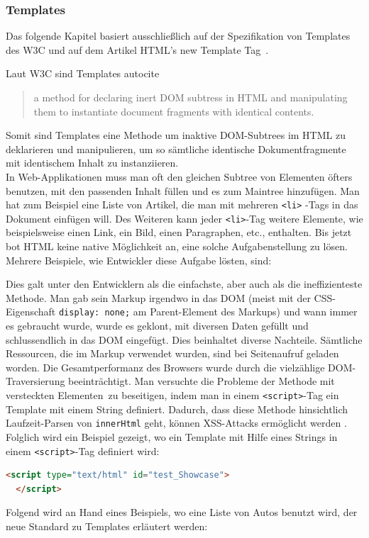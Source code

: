 \subsubsection{Templates}
\label{sec:3_WC_Templates}

Das folgende Kapitel basiert ausschließlich auf der Spezifikation von Templates des W3C \citereset \autocite{Weinstein.2013} und auf dem Artikel \glqq HTML's new Template Tag\grqq\ \citereset \autocite{BidelmanTemplate.2013}.

Laut W3C sind Templates autocite
\begin{quote}
\glqq
  a method for declaring inert DOM subtress in HTML and manipulating them to instantiate document fragments with identical contents.
\grqq
\end{quote}
Somit sind Templates eine Methode um inaktive DOM-Subtrees im HTML zu deklarieren und manipulieren, um so sämtliche identische Dokumentfragmente mit identischem Inhalt zu instanziieren.\\
In Web-Applikationen muss man oft den gleichen Subtree von Elementen öfters benutzen, mit den passenden Inhalt füllen und es zum Maintree hinzufügen. Man hat zum Beispiel eine Liste von Artikel, die man mit mehreren \lstinline|<li>| -Tags in das Dokument einfügen will. Des Weiteren kann jeder \lstinline|<li>|-Tag weitere Elemente, wie beispielsweise einen Link, ein Bild, einen Paragraphen, etc., enthalten. Bis jetzt bot HTML keine native Möglichkeit an, eine solche Aufgabenstellung zu lösen. Mehrere Beispiele, wie Entwickler diese Aufgabe lösten, sind:
\begin{enumerate}
Dies galt unter den Entwicklern als die einfachste, aber auch als die ineffizienteste Methode. Man gab sein Markup irgendwo in das DOM (meist mit der CSS-Eigenschaft \lstinline|display: none;| am Parent-Element des Markups) und wann immer es gebraucht wurde, wurde es geklont, mit diversen Daten gefüllt und schlussendlich in das DOM eingefügt. Dies beinhaltet diverse Nachteile. Sämtliche Ressourcen, die im Markup verwendet wurden, sind bei Seitenaufruf geladen worden. Die Gesamtperformanz des Browsers wurde durch die vielzählige DOM-Traversierung beeinträchtigt.
Man versuchte die Probleme der Methode mit \glqq versteckten Elementen\grqq\ zu beseitigen, indem man in einem \lstinline|<script>|-Tag ein Template mit einem String definiert. Dadurch, dass diese Methode hinsichtlich Laufzeit-Parsen von \lstinline|innerHtml| geht, können XSS-Attacks ermöglicht werden . Folglich wird ein Beispiel gezeigt, wo ein Template mit Hilfe eines Strings in einem \lstinline|<script>|-Tag definiert wird:
\begin{lstlisting}[language=HTML, caption=String-Template]
  <script type="text/html" id="test_Showcase">
  </script>
\end{lstlisting}
\end{enumerate}
Folgend wird an Hand eines Beispiels, wo eine Liste von Autos benutzt wird, der neue Standard zu Templates erläutert werden:\\


